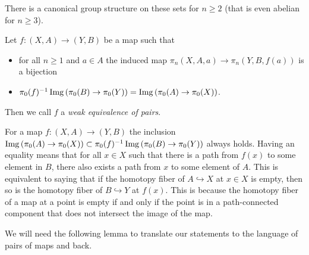 There is a canonical group structure on these sets for $n\geq 2$ (that is even abelian for $n\geq 3$).
\begin{definition}\label{def:weOfPairs}
    Let $f\colon(X,A)\to (Y,B)$ be a map such that 
    \begin{itemize}
        \item for all $n\geq 1$ and $a\in A$ the induced map $\pi_n(X,A,a)\to\pi_n(Y,B,f(a))$ is a bijection
        \item $\pi_0(f)^{-1}\operatorname{Img}\left(\pi_0(B)\to\pi_0(Y)\right)=\operatorname{Img}\left(\pi_0(A)\to\pi_0(X)\right)$.
    \end{itemize}
    Then we call $f$ a \emph{weak equivalence of pairs}.
\end{definition}
\begin{remark}\label{rmk:emptyFiber}
    For a map $f\colon(X,A)\to (Y,B)$ the inclusion $\operatorname{Img}\left(\pi_0(A)\to\pi_0(X)\right)\subset\pi_0(f)^{-1}\operatorname{Img}\left(\pi_0(B)\to\pi_0(Y)\right)$ always holds.
    Having an equality means that for all $x\in X$ such that there is a path from $f(x)$ to some element in $B$, there also exists a path from $x$ to some element of $A$.
    This is equivalent to saying that if the homotopy fiber of $A\hookrightarrow X$ at $x\in X$ is empty, then so is the homotopy fiber of $B\hookrightarrow Y$ at $f(x)$.
    This is because the homotopy fiber of a map at a point is empty if and only if the point is in a path-connected component that does not intersect the image of the map.
\end{remark}
We will need the following lemma to translate our statements to the language of pairs of maps and back.
